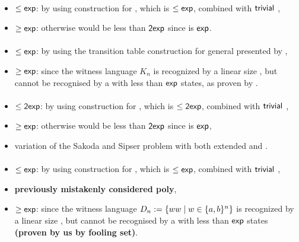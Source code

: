 \paragraph{\OMOLA{}\tto\TNFA}
\begin{itemize}
	\item $\le\mathsf{exp}$: by using construction for \hyperref[cost:OM1LAto1NFA]{\OMOLA{}\tto\ONFA}, which is $\le\mathsf{exp}$, combined with $\mathsf{trivial}$ \ONFA{}\tto\TNFA,
	\item $\ge\mathsf{exp}$: otherwise \hyperref[cost:OM1LAto1DFA]{\OMOLA{}\tto\ODFA} would be less than $\mathsf{2exp}$ since\linebreak\hyperref[cost:2NFAto1DFA]{\TNFA{}\tto\ODFA} is $\mathsf{exp}$.
\end{itemize}
\paragraph{\OMODLA{}\tto\ODFA}\label{cost:OM1DLAto1DFA}
\begin{itemize}
	\item $\le\mathsf{exp}$: by using the transition table construction for general \ODLA presented by ,
	\item $\ge\mathsf{exp}$: since the witness language $K_n$ is recognized by a linear size \OMODLA, but cannot be recognised by a \TNFA with less than $\mathsf{exp}$ states, as proven by .
\end{itemize}
\paragraph{\OMOLA{}\tto\OMODLA}
\begin{itemize}
	\item $\le\mathsf{2exp}$: by using construction for \hyperref[cost:OM1LAto1DFA]{\OMOLA{}\tto\ODFA}, which is $\le\mathsf{2exp}$, combined with $\mathsf{trivial}$ \ODFA{}\tto\OMODLA,
	\item $\ge\mathsf{exp}$: otherwise \hyperref[cost:OM1LAto1DFA]{\OMOLA{}\tto\ODFA} would be less than $\mathsf{2exp}$ since \hyperref[cost:OM1DLAto1DFA]{\OMODLA{}\tto\ODFA} is $\mathsf{exp}$,
	\item variation of the Sakoda and Sipser problem with both extended \TNFA and \TDFA.
\end{itemize}
\paragraph{\OMODLA{}\tto\ONFA}
\begin{itemize}
	\item $\le\mathsf{exp}$: by using construction for \hyperref[cost:OM1DLAto1DFA]{\OMODLA{}\tto\ODFA}, which is $\le\mathsf{exp}$, combined with $\mathsf{trivial}$ \ODFA{}\tto\ONFA,
	\item \textbf{previously mistakenly considered poly},
	\item $\ge\mathsf{exp}$: since the witness language $D_n:=\{ww\mid w\in\{a,b\}^n\}$ is recognized by a linear size \OMODLA, but cannot be recognised by a \ONFA with less than $\mathsf{exp}$ states \textbf{(proven by us by fooling set)}.
\end{itemize}
